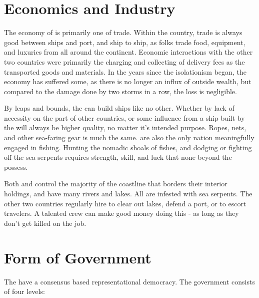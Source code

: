 \documentclass[blue]{GL2020}
\begin{document}
\section*{Economics and Industry}
The economy of \pShip{} is primarily one of trade. Within the country, trade is always good between ships and port, and ship to ship, as folks trade food, equipment, and luxuries from all around the continent. Economic interactions with the other two countries were primarily the charging and collecting of delivery fees as the \pShippies{} transported goods and materials. In the years since the isolationism began, the economy has suffered some, as there is no longer an influx of outside wealth, but compared to the damage done by two storms in a row, the loss is negligible.

By leaps and bounds, the \pShippies{} can build ships like no other. Whether by lack of necessity on the part of other countries, or some influence from \cEbbFull{} a ship built by the \pShippies{} will always be higher quality, no matter it's intended purpose. Ropes, nets, and other sea-faring gear is much the same. \pShippies{} are also the only nation meaningfully engaged in fishing. Hunting the nomadic shoals of fishes, and dodging or fighting off the sea serpents requires strength, skill, and luck that none beyond the \pShippies{} possess.

Both \pFarm{} and \pTech{} control the majority of the coastline that borders their interior holdings, and \pFarm{} have many rivers and lakes. All are infested with sea serpents. The other two countries regularly hire \pShippies{} to clear out lakes, defend a port, or to escort travelers. A talented crew can make good money doing this - as long as they don't get killed on the job.

\section*{Form of Government} The \pShippies{} have a consensus based representational democracy. The government consists of four levels:
\end{document}
